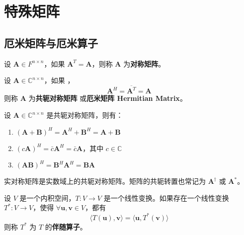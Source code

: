 \section{特殊矩阵}

\subsection{厄米矩阵与厄米算子}

\begin{definition}
    设 $\mathbf{A} \in F^{n \times n}$，如果 $\mathbf{A}^T = \mathbf{A}$，则称 $\mathbf{A}$ 为\textbf{对称矩阵}。
    \label{def:symmetric_matrix}
\end{definition}

\begin{definition}
    设 $\mathbf{A} \in \mathbb{C}^{n \times n}$，如果 ，
    \[
        \mathbf{A}^H = \overline{\mathbf{A}^T} = \mathbf{A}
    \]
    则称 $\mathbf{A}$ 为\textbf{共轭对称矩阵} 或\textbf{厄米矩阵 Hermitian Matrix}。
    \label{def:hermitian_matrix}
\end{definition}

\begin{proposition}[共轭对称矩阵的性质]
    设 $\mathbf{A} \in \mathbb{C}^{n \times n}$ 是共轭对称矩阵，则有：
    \begin{enumerate}
        \item $(\mathbf{A}+\mathbf{B})^H = \mathbf{A}^H + \mathbf{B}^H = \mathbf{A}+\mathbf{B}$
        \item $(c\mathbf{A})^H = \bar{c} \mathbf{A}^H = \bar{c} \mathbf{A}$，其中 $c\in \mathbb{C}$
        \item $(\mathbf{A}\mathbf{B})^H = \mathbf{B}^H \mathbf{A}^H = \mathbf{B} \mathbf{A}$
    \end{enumerate}
\end{proposition}
\begin{note}
    实对称矩阵是实数域上的共轭对称矩阵。矩阵的共轭转置也常记为 $\mathbf{A}^{\dagger}$ 或 $\mathbf{A}^*$。
\end{note}
\vspace{1em}

\begin{definition}
    设 $V$ 是一个内积空间，$T:V\to V$ 是一个线性变换。如果存在一个线性变换 $T^*:V\to V$，使得 $\forall \mathbf{u},\mathbf{v}\in V$，都有
    \[
        \langle T(\mathbf{u}),\mathbf{v} \rangle = \langle \mathbf{u},T^*(\mathbf{v}) \rangle
    \]
    则称 $T^*$ 为 $T$ 的\textbf{伴随算子}。
    \label{def:adjoint_operator}
\end{definition}

